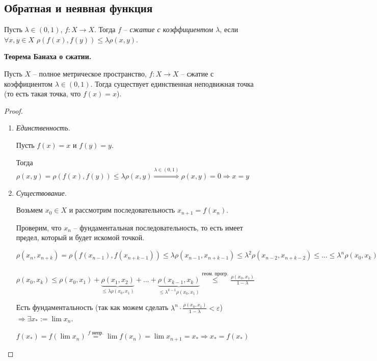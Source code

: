 \subsection{Обратная и неявная функция}
\begin{definition}
    Пусть $\lambda\in (0, 1)$, $f: X\rightarrow X$. Тогда $f$ – \textit{сжатие с коэффициентом $\lambda$}, если $\forall x, y\in X$ $\rho(f(x), f(y))\leq \lambda \rho(x, y)$.
\end{definition}

\begin{theorem}
    \textbf{Теорема Банаха о сжатии.}

    Пусть $X$ – полное метрическое пространство, $f: X\rightarrow X$ – сжатие с коэффициентом $\lambda\in (0, 1)$. Тогда существует единственная неподвижная точка (то есть такая точка, что $f(x)=x$).
\end{theorem}

\begin{proof}~
    \begin{enumerate}
        \item \textit{Единственность.}

        Пусть $f(x)=x$ и $f(y)= y$. 
        
        Тогда $\rho(x, y)=\rho(f(x), f(y))\leq \lambda \rho(x, y)\overset{\lambda \in (0, 1)}{\Rightarrow} \rho(x, y)=0\Rightarrow x=y$
        \item \textit{Существование.}

        Возьмем $x_0\in X$ и рассмотрим последовательность $x_{n+1}=f(x_n)$. 
        
        Проверим, что $x_n$ – фундаментальная последовательность, то есть имеет предел, который и будет искомой точкой.

        $\rho(x_n, x_{n+k})=\rho(f(x_{n-1}), f(x_{n+k-1}))\leq \lambda\rho(x_{n-1}, x_{n+k-1})\leq \lambda^2 \rho(x_{n-2}, x_{n+k-2})\leq ... \leq \lambda^n\rho(x_0, x_k)\leq \underset{\rightarrow 0}{\lambda^n}\cdot \underset{=const}{\frac{\rho(x_0, x_1)}{1-\lambda}}$

        $\rho(x_0, x_k)\leq \rho(x_0, x_1) + \underbrace{\rho(x_1, x_2)}_{\leq \lambda\rho(x_0, x_1)} + ... + \underbrace{\rho(x_{k-1}, x_{k})}_{\leq \lambda^{k-1}\rho(x_0, x_1)}\overset{\text{геом. прогр.}}{\leq} \frac{\rho(x_0, x_1)}{1-\lambda}$

        Есть фундаментальность (так как можем сделать $\lambda^n\cdot \frac{\rho(x_0, x_1)}{1-\lambda}<\varepsilon$) $\Rightarrow \exists x_*:= \lim x_n$.

        $f(x_*)=f(\lim x_n)\overset{f\text{ непр.}}{=}\lim f(x_n)=\lim x_{n+1}=x_*\Rightarrow x_*=f(x_*)$
    \end{enumerate}
\end{proof}

